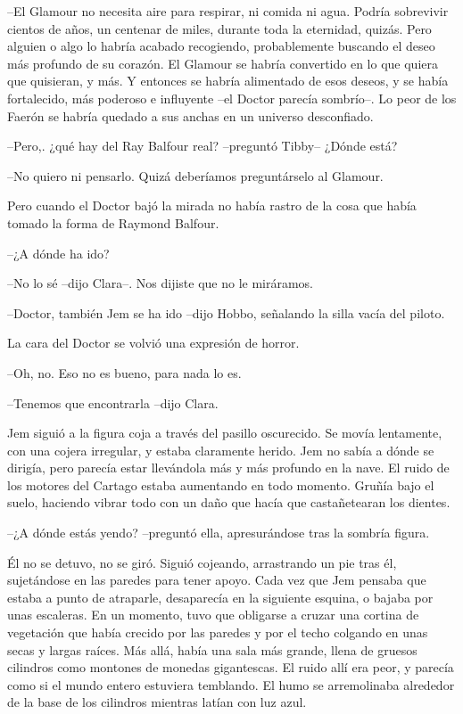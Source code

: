 {--El Glamour no necesita aire para respirar, ni comida ni agua. Podría
 sobrevivir cientos de años, un centenar de miles, durante toda la
 eternidad, quizás. Pero alguien o algo lo habría acabado recogiendo,
 probablemente buscando el deseo más profundo de su corazón. El Glamour
 se habría convertido en lo que quiera que quisieran, y más. Y entonces
 se habría alimentado de esos deseos, y se había fortalecido, más
 poderoso e influyente --el Doctor parecía sombrío--. Lo peor de los
Faerón se habría quedado a sus anchas en un universo desconfiado.}

{--Pero,. ¿qué hay del Ray Balfour real? --preguntó Tibby-- ¿Dónde
está?}

{--No quiero ni pensarlo. Quizá deberíamos preguntárselo al Glamour.}

{Pero cuando el Doctor bajó la mirada no había rastro de la cosa que
había tomado la forma de Raymond Balfour.}

{--¿A dónde ha ido?}

{--No lo sé --dijo Clara--. Nos dijiste que no le miráramos.}

{--Doctor, también Jem se ha ido --dijo Hobbo, señalando la silla vacía
del piloto.}

{La cara del Doctor se volvió una expresión de horror.}

{--Oh, no. Eso no es bueno, para nada lo es.}

{--Tenemos que encontrarla --dijo Clara.}

{Jem siguió a la
 figura coja a través del pasillo oscurecido. Se movía lentamente, con
 una cojera irregular, y estaba claramente herido. Jem no sabía a dónde
 se dirigía, pero parecía estar llevándola más y más profundo en la nave.
 El ruido de los motores del Cartago estaba aumentando en todo momento.
 Gruñía bajo el suelo, haciendo vibrar todo con un daño que hacía que
castañetearan los dientes.}

{--¿A dónde estás yendo? --preguntó ella, apresurándose tras la sombría
figura.}

{Él no se detuvo, no se giró. Siguió cojeando, arrastrando un pie tras
 él, sujetándose en las paredes para tener apoyo. Cada vez que Jem
 pensaba que estaba a punto de atraparle, desaparecía en la siguiente
 esquina, o bajaba por unas escaleras. En un momento, tuvo que obligarse
 a cruzar una cortina de vegetación que había crecido por las paredes y
 por el techo colgando en unas secas y largas raíces. Más allá, había una
 sala más grande, llena de gruesos cilindros como montones de monedas
 gigantescas. El ruido allí era peor, y parecía como si el mundo entero
 estuviera temblando. El humo se arremolinaba alrededor de la base de los
cilindros mientras latían con luz azul.}

